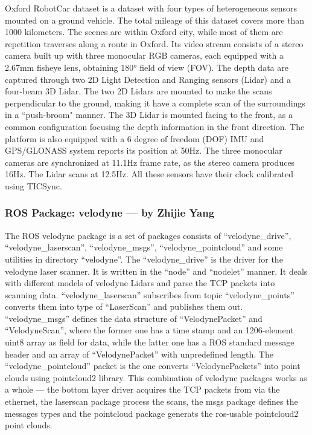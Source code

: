 \documentclass[conference]{IEEEtran}
\begin{document}
	Oxford RobotCar dataset\cite{RobotCar} is a dataset with four types of heterogeneous sensors mounted on a ground vehicle. The total mileage of this dataset covers more than 1000 kilometers. The scenes are within Oxford city, while most of them are repetition traverses along a route in Oxford. Its video stream consists of a stereo camera built up with three monocular RGB cameras, each equipped with a 2.67mm fisheye lens, obtaining \ang{180} field of view (FOV). The depth data are captured through two 2D Light Detection and Ranging sensors (Lidar) and a four-beam 3D Lidar. The two 2D Lidars are mounted to make the scans perpendicular to the ground, making it have a complete scan of the surroundings in a ``push-broom" manner. The 3D Lidar is mounted facing to the front, as a common configuration focusing the depth information in the front direction. The platform is also equipped with a 6 degree of freedom (DOF) IMU and GPS/GLONASS system reports its position at 50Hz. The three monocular cameras are synchronized at 11.1Hz frame rate, as the stereo camera produces 16Hz. The Lidar scans at 12.5Hz. All these sensors have their clock calibrated using TICSync. 
	
	\subsubsection{ROS Package: velodyne --- by Zhijie Yang}
	The ROS velodyne package is a set of packages consists of ``velodyne\_drive'', ``velodyne\_laserscan'', ``velodyne\_msgs'',  ``velodyne\_pointcloud'' and some utilities in directory ``velodyne''. The ``velodyne\_drive'' is the driver for the velodyne laser scanner. It is written in the ``node'' and ``nodelet'' manner. It deals with different models of velodyne Lidars and parse the TCP packets into scanning data. ``velodyne\_laserscan'' subscribes from topic ``velodyne\_points'' converts them into type of ``LaserScan'' and publishes them out. ``velodyne\_msgs'' defines the data structure of ``VelodynePacket'' and ``VelodyneScan'', where the former one has a time stamp and an 1206-element uint8 array as field for data, while the latter one has a ROS standard message header and an array of ``VelodynePacket'' with unpredefined length. The ``velodyne\_pointcloud'' packet is the one converts ``VelodynePackets'' into point clouds using pointcloud2 library. This combination of velodyne packages works as a whole --- the bottom layer driver acquires the TCP packets from via the ethernet, the laserscan package process the scans, the msgs package defines the messages types and the pointcloud package generats the ros-usable pointcloud2 point clouds. 
	
\end{document}
